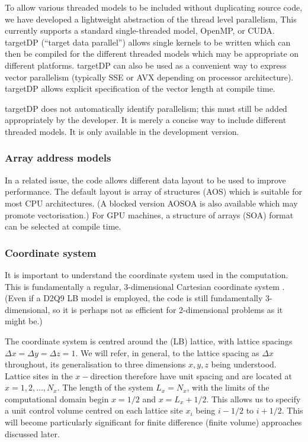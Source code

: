 To allow various threaded models to be included without duplicating
source code, we have developed a lightweight abstraction of the
thread level parallelism, This currently supports a standard single-threaded
model, OpenMP, or CUDA. targetDP (``target data parallel'') allows single
kernels to be written which can then be compiled for the different threaded
models which may be appropriate on different platforms. targetDP can also
be used as a convenient way to express vector parallelism
(typically SSE or AVX depending on processor architecture). targetDP allows
explicit specification of the vector length at compile time.

targetDP does not automatically identify parallelism; this must still be
added appropriately by the developer. It is merely a concise way to include
different threaded models. It is only available in the development version.

\subsubsection{Array address models}

In a related issue, the code allows different data layout to be used
to improve performance. The default layout is array of structures (AOS)
which is suitable for most CPU architectures. (A blocked version AOSOA
is also available which may promote vectorisation.) For GPU machines, a
structure of arrays (SOA) format can be selected at compile time.


\subsubsection{Coordinate system}

It is important to understand the coordinate system used in the
computation. This is fundamentally a regular, 3-dimensional Cartesian
coordinate system . (Even if a D2Q9 LB model is employed, the code is
still fundamentally 3-dimensional, so it is perhaps not as efficient  
for 2-dimensional problems as it might be.)

The coordinate system is centred around the (LB) lattice, with lattice
spacings $\Delta x = \Delta y = \Delta z = 1$. We will refer, in general,
to the lattice spacing as $\Delta x$ throughout, its generalisation to
three dimensions $x,y,z$ being understood. Lattice sites in the
$x-$direction therefore have unit spacing and are located at
$x = 1, 2, \ldots, N_x$.
The length of the system $L_x = N_x$, with the limits of
the computational domain begin $x = 1/2$ and $x = L_x + 1/2$. This allows
us to specify a unit control volume centred on each lattice site $x_i$
being $i-1/2$ to $i + 1/2$. This will become particularly significant for
finite difference (finite volume) approaches discussed later.

